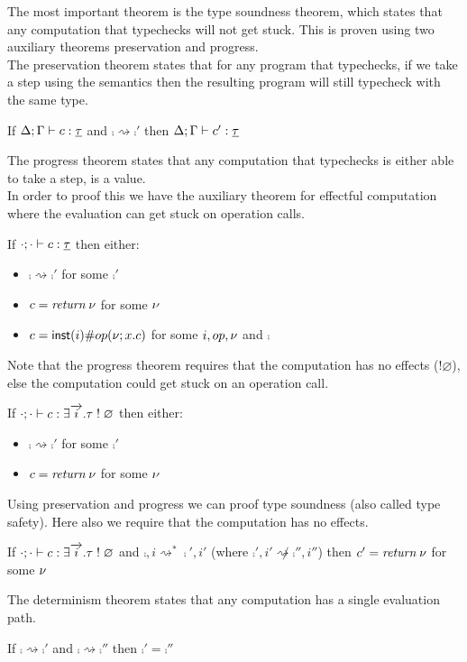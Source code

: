 The most important theorem is the type soundness theorem, which states that any computation that typechecks will not get stuck.
This is proven using two auxiliary theorems preservation and progress.\\
The preservation theorem states that for any program that typechecks, if we take a step using the semantics then the resulting program will still typecheck with the same type.
\begin{theorem}[Preservation]
If $\Delta;\Gamma \vdash c : \underline{\tau}$ and $\comp \rightsquigarrow \comp'$ then $\Delta;\Gamma \vdash c' : \underline{\tau}$
\end{theorem}
The progress theorem states that any computation that typechecks is either able to take a step, is a value.\\
In order to proof this we have the auxiliary theorem for effectful computation where the evaluation can get stuck on operation calls.
\begin{theorem}
If $\cdot;\cdot \vdash c : \underline{\tau}$ then either:
\begin{itemize}
\item $\comp \rightsquigarrow \comp'$ for some $\comp'$
\item $c = \textit{return} \; \nu$ for some $\nu$
\item $c = \mathsf{inst}(i) \# op(\nu ; x . c)$ for some $i, op, \nu$ and $\comp$
\end{itemize}
\end{theorem}
Note that the progress theorem requires that the computation has no effects ($!\varnothing$), else the computation could get stuck on an operation call.
\begin{theorem}[Progress]
If $\cdot;\cdot \vdash c : \exists \overrightarrow{i} . \tau \; ! \; \varnothing$ then either:
\begin{itemize}
\item $\comp \rightsquigarrow \comp'$ for some $\comp'$
\item $c = \textit{return} \; \nu$ for some $\nu$
\end{itemize}
\end{theorem}

Using preservation and progress we can proof type soundness (also called type safety). Here also we require that the computation has no effects.
\begin{theorem}
If $\cdot;\cdot \vdash c : \exists \overrightarrow{i} . \tau \; ! \; \varnothing$ and $\comp, i \rightsquigarrow^* \comp', i'$ (where $\comp', i' \not\rightsquigarrow \comp'', i''$) then $c' = \textit{return} \; \nu$ for some $\nu$

The determinism theorem states that any computation has a single evaluation path.
\begin{theorem}[Determinism]
If $\comp \rightsquigarrow \comp'$ and $\comp \rightsquigarrow \comp''$ then $\comp' = \comp''$  \\
\end{theorem}
\end{theorem}

